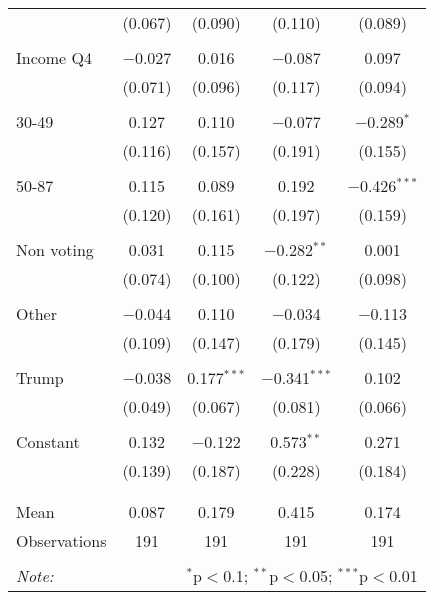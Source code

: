 \begin{tabular}{@{\extracolsep{5pt}}lcccc}
  & (0.067) & (0.090) & (0.110) & (0.089) \\ 
  & & & & \\ 
 Income Q4 & $-$0.027 & 0.016 & $-$0.087 & 0.097 \\ 
  & (0.071) & (0.096) & (0.117) & (0.094) \\ 
  & & & & \\ 
 30-49 & 0.127 & 0.110 & $-$0.077 & $-$0.289$^{*}$ \\ 
  & (0.116) & (0.157) & (0.191) & (0.155) \\ 
  & & & & \\ 
 50-87 & 0.115 & 0.089 & 0.192 & $-$0.426$^{***}$ \\ 
  & (0.120) & (0.161) & (0.197) & (0.159) \\ 
  & & & & \\ 
 Non voting & 0.031 & 0.115 & $-$0.282$^{**}$ & 0.001 \\ 
  & (0.074) & (0.100) & (0.122) & (0.098) \\ 
  & & & & \\ 
 Other & $-$0.044 & 0.110 & $-$0.034 & $-$0.113 \\ 
  & (0.109) & (0.147) & (0.179) & (0.145) \\ 
  & & & & \\ 
 Trump & $-$0.038 & 0.177$^{***}$ & $-$0.341$^{***}$ & 0.102 \\ 
  & (0.049) & (0.067) & (0.081) & (0.066) \\ 
  & & & & \\ 
 Constant & 0.132 & $-$0.122 & 0.573$^{**}$ & 0.271 \\ 
  & (0.139) & (0.187) & (0.228) & (0.184) \\ 
  & & & & \\ 
\hline \\[-1.8ex] 
Mean & 0.087 & 0.179 & 0.415 & 0.174 \\ 
Observations & 191 & 191 & 191 & 191 \\ 
\hline 
\hline \\[-1.8ex] 
\textit{Note:}  & \multicolumn{4}{r}{$^{*}$p$<$0.1; $^{**}$p$<$0.05; $^{***}$p$<$0.01} \\ 
\end{tabular} 
